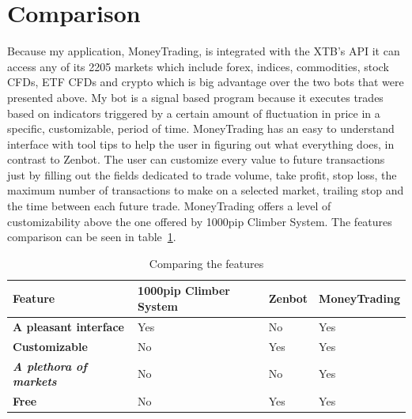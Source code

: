 \documentclass[12pt,a4paper]{report}
\begin{document}
\section{Comparison}
Because my application, MoneyTrading, is integrated with the XTB's API it can access any of its 2205 markets which include forex, indices, commodities, stock CFDs, ETF CFDs and crypto which is big advantage over the two bots that were presented above. My bot is a signal based program because it executes trades based on indicators triggered by a certain amount of fluctuation in price in a specific, customizable, period of time. MoneyTrading has an easy to understand interface with tool tips to help the user in figuring out what everything does, in contrast to Zenbot. The user can customize every value to future transactions just by filling out the fields dedicated to trade volume, take profit, stop loss, the maximum number of transactions to make on a selected market, trailing stop and the time between each future trade. MoneyTrading offers a level of customizability above the one offered by 1000pip Climber System. The features comparison can be seen in table~\ref{tab:comparsion}. 
\break
\renewcommand{\arraystretch}{1.5}
\begin{table}[th]\small\linespread{1}
	\begin{tabular}{l >{\raggedright\arraybackslash}p{3.5cm} >{\raggedright\arraybackslash}p{3.5cm} >{\raggedright\arraybackslash}p{3.5cm}}
		\textbf{Feature} & \textbf{1000pip Climber System} & \textbf{Zenbot} &\textbf{MoneyTrading} \\ [0.5cm]\hline
		\textbf{A pleasant interface} & Yes & No & Yes \\[0.5cm]\hline
		\textbf{Customizable} & No & Yes & Yes \\ [0.5cm]\hline
		\textbf{\textit{A plethora of markets}} & No & No & Yes \\ [0.5cm]\hline
		\textbf{Free} & No & Yes & Yes\\ [0.5cm]\hline
	\end{tabular}
	\caption{Comparing the features}
	\label{tab:comparsion}
\end{table}
\end{document}
